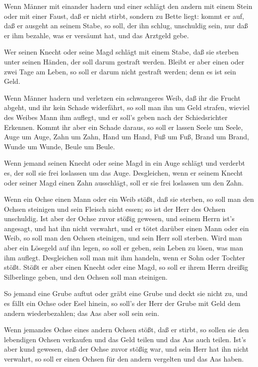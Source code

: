  Wenn Männer mit einander hadern und einer schlägt den
andern mit einem Stein oder mit einer Faust, daß er nicht stirbt,
sondern zu Bette liegt:  kommt er auf, daß er ausgeht an
seinem Stabe, so soll, der ihn schlug, unschuldig sein, nur daß er ihm
bezahle, was er versäumt hat, und das Arztgeld gebe.

 Wer seinen Knecht oder seine Magd schlägt mit einem Stabe,
daß sie sterben unter seinen Händen, der soll darum gestraft werden.
 Bleibt er aber einen oder zwei Tage am Leben, so soll er
darum nicht gestraft werden; denn es ist sein Geld.

 Wenn Männer hadern und verletzen ein schwangeres Weib, daß
ihr die Frucht abgeht, und ihr kein Schade widerfährt, so soll man ihn
um Geld strafen, wieviel des Weibes Mann ihm auflegt, und er soll's
geben nach der Schiedsrichter Erkennen.  Kommt ihr aber ein
Schade daraus, so soll er lassen Seele um Seele,  Auge um
Auge, Zahn um Zahn, Hand um Hand, Fuß um Fuß,  Brand um
Brand, Wunde um Wunde, Beule um Beule.

 Wenn jemand seinen Knecht oder seine Magd in ein Auge
schlägt und verderbt es, der soll sie frei loslassen um das Auge.
 Desgleichen, wenn er seinem Knecht oder seiner Magd einen
Zahn ausschlägt, soll er sie frei loslassen um den Zahn.

 Wenn ein Ochse einen Mann oder ein Weib stößt, daß sie
sterben, so soll man den Ochsen steinigen und sein Fleisch nicht essen;
so ist der Herr des Ochsen unschuldig.  Ist aber der Ochse
zuvor stößig gewesen, und seinem Herrn ist's angesagt, und hat ihn nicht
verwahrt, und er tötet darüber einen Mann oder ein Weib, so soll man den
Ochsen steinigen, und sein Herr soll sterben.  Wird man
aber ein Lösegeld auf ihn legen, so soll er geben, sein Leben zu lösen,
was man ihm auflegt.  Desgleichen soll man mit ihm handeln,
wenn er Sohn oder Tochter stößt.  Stößt er aber einen
Knecht oder eine Magd, so soll er ihrem Herrn dreißig Silberlinge geben,
und den Ochsen soll man steinigen.

 So jemand eine Grube auftut oder gräbt eine Grube und
deckt sie nicht zu, und es fällt ein Ochse oder Esel hinein,
 so soll's der Herr der Grube mit Geld dem andern
wiederbezahlen; das Aas aber soll sein sein.

 Wenn jemandes Ochse eines andern Ochsen stößt, daß er
stirbt, so sollen sie den lebendigen Ochsen verkaufen und das Geld
teilen und das Aas auch teilen.  Ist's aber kund gewesen,
daß der Ochse zuvor stößig war, und sein Herr hat ihn nicht verwahrt, so
soll er einen Ochsen für den andern vergelten und das Aas haben.

